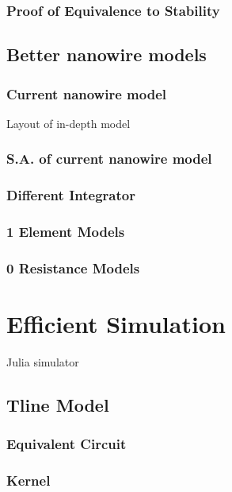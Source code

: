 \documentclass{article}
\begin{document}
\subsubsection{Proof of Equivalence to Stability}

\subsection{Better nanowire models}

\subsubsection{Current nanowire model}

Layout of in-depth model

\subsubsection{S.A. of current nanowire model}

\subsubsection{Different Integrator}

\subsubsection{1 Element Models}

\subsubsection{0 Resistance Models}

\section{Efficient Simulation}

Julia simulator

\subsection{Tline Model}

\subsubsection{Equivalent Circuit}

\subsubsection{Kernel}
\end{document}
